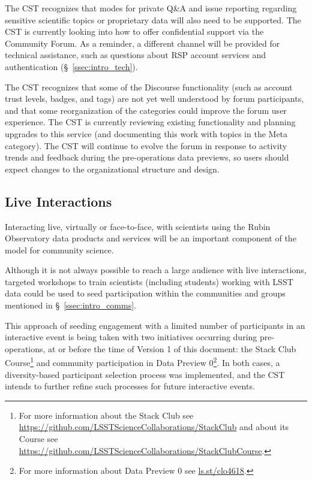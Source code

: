 \documentclass[DM,authoryear,toc]{lsstdoc}
\begin{document}

The CST recognizes that modes for private Q\&A and issue reporting regarding sensitive scientific topics or proprietary data will also need to be supported.
The CST is currently looking into how to offer confidential support via the Community Forum.
As a reminder, a different channel will be provided for technical assistance, such as questions about RSP account services and authentication (\S~\ref{ssec:intro_tech}).

The CST recognizes that some of the Discourse functionality (such as account trust levels, badges, and tags) are not yet well understood by forum participants, and that some reorganization of the categories could improve the forum user experience.
The CST is currently reviewing existing functionality and planning upgrades to this service (and documenting this work with topics in the Meta category).
The CST will continue to evolve the forum in response to activity trends and feedback during the pre-operations data previews, so users should expect changes to the organizational structure and design. 


\subsection{Live Interactions}\label{ssec:mod_interact}

Interacting live, virtually or face-to-face, with scientists using the Rubin Observatory data products and services will be an important component of the model for community science.

Although it is not always possible to reach a large audience with live interactions, targeted workshops to train scientists (including students) working with LSST data could be used to seed participation within the communities and groups mentioned in \S~\ref{ssec:intro_comms}.

This approach of seeding engagement with a limited number of participants in an interactive event is being taken with two initiatives occurring during pre-operations, at or before the time of Version 1 of this document: the Stack Club Course\footnote{For more information about the Stack Club see \url{https://github.com/LSSTScienceCollaborations/StackClub} and about its Course see \url{https://github.com/LSSTScienceCollaborations/StackClubCourse}.} and community participation in Data Preview 0\footnote{For more information about Data Preview 0 see \url{ls.st/clo4618}.}.
In both cases, a diversity-based participant selection process was implemented, and the CST intends to further refine such processes for future interactive events. 
\end{document}
